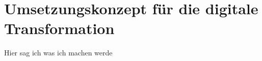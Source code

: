 \section{Umsetzungskonzept für die digitale Transformation}

 Hier sag ich was ich machen werde

 
 
 



